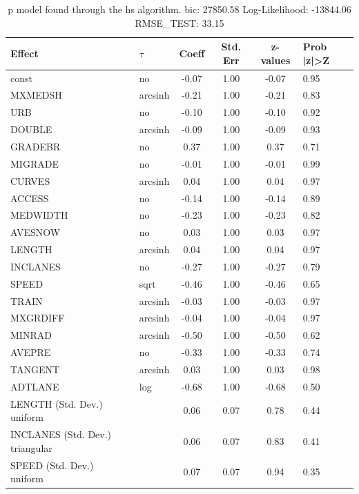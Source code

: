 \begin{table}
	\caption{p model found through the hs algorithm. bic: 27850.58 Log-Likelihood: -13844.06 RMSE_TEST: 33.15}
	\begin{center}
		\begin{tabular}{|l|l|c|c|c|l|}
			\hline
			Effect & $\tau$ & Coeff & Std. Err & z-values & Prob |z|>Z \\
			\hline
			const & no & -0.07 & 1.00 & -0.07 & 0.95 \\
			\hline
			MXMEDSH & arcsinh & -0.21 & 1.00 & -0.21 & 0.83 \\
			\hline
			URB & no & -0.10 & 1.00 & -0.10 & 0.92 \\
			\hline
			DOUBLE & arcsinh & -0.09 & 1.00 & -0.09 & 0.93 \\
			\hline
			GRADEBR & no & 0.37 & 1.00 & 0.37 & 0.71 \\
			\hline
			MIGRADE & no & -0.01 & 1.00 & -0.01 & 0.99 \\
			\hline
			CURVES & arcsinh & 0.04 & 1.00 & 0.04 & 0.97 \\
			\hline
			ACCESS & no & -0.14 & 1.00 & -0.14 & 0.89 \\
			\hline
			MEDWIDTH & no & -0.23 & 1.00 & -0.23 & 0.82 \\
			\hline
			AVESNOW & no & 0.03 & 1.00 & 0.03 & 0.97 \\
			\hline
			LENGTH & arcsinh & 0.04 & 1.00 & 0.04 & 0.97 \\
			\hline
			INCLANES & no & -0.27 & 1.00 & -0.27 & 0.79 \\
			\hline
			SPEED & sqrt & -0.46 & 1.00 & -0.46 & 0.65 \\
			\hline
			TRAIN & arcsinh & -0.03 & 1.00 & -0.03 & 0.97 \\
			\hline
			MXGRDIFF & arcsinh & -0.04 & 1.00 & -0.04 & 0.97 \\
			\hline
			MINRAD & arcsinh & -0.50 & 1.00 & -0.50 & 0.62 \\
			\hline
			AVEPRE & no & -0.33 & 1.00 & -0.33 & 0.74 \\
			\hline
			TANGENT & arcsinh & 0.03 & 1.00 & 0.03 & 0.98 \\
			\hline
			ADTLANE & log & -0.68 & 1.00 & -0.68 & 0.50 \\
			\hline
			LENGTH (Std. Dev.) uniform &  & 0.06 & 0.07 & 0.78 & 0.44 \\
			\hline
			INCLANES (Std. Dev.) triangular &  & 0.06 & 0.07 & 0.83 & 0.41 \\
			\hline
			SPEED (Std. Dev.) uniform &  & 0.07 & 0.07 & 0.94 & 0.35 \\

\end{tabular}
\end{center}
\end{table}
